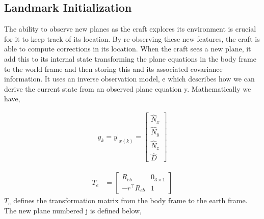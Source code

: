 \documentclass[]{article}
\begin{document}
{%

\subsection{Landmark Initialization} %
\label{sub:landmark_initialization}
The ability to observe new planes as the craft explores its environment is crucial for it to keep track of its location. By re-observing these new features, the craft is able to compute corrections in its location. When the craft sees a new plane, it add this to its internal state transforming the plane equations in the body frame to the world frame and then storing this and its associated covariance information. It uses an inverse observation model, e which describes how we can derive the current state from an observed plane equation y. Mathematically we have,

\begin{align}
	y_{k} = y|_{x(k)} =  
	\left[
	\begin{matrix}
		\hat{N}_x \\
		\hat{N}_y \\
		\hat{N}_z \\
		\hat{D}
	\end{matrix}
	\right]
\end{align}

\begin{align}
	T_e &= 
	\left[
	\begin{matrix}
		R_{eb} 			& 0_{3\times1} \\
		-r^\top R_{eb}	& 1
	\end{matrix}
	\right]
\end{align}
$T_e$ defines the transformation matrix from the body frame to the earth frame. The new plane numbered j is defined below, 

}
\end{document}
